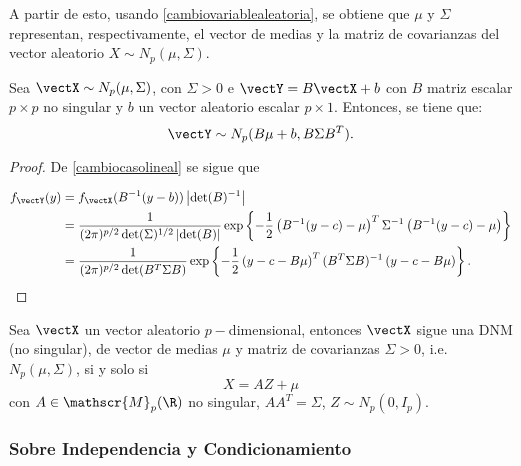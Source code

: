 A partir de esto, usando \ref{cambiovariablealeatoria}, se obtiene que $\mu$ y $\Sigma$ representan, respectivamente, el vector de medias y la matriz de covarianzas del vector aleatorio $X \sim N_p(\mu,\Sigma)$.


\begin{nprop} \label{afinnormal}
  Sea $\vectX \sim N_p(\mu,\Sigma)$, con $\Sigma > 0$ e $\vectY = B\vectX+b$ con $B$ matriz escalar $p\times p$ no singular y $b$ un vector aleatorio escalar $p\times 1$. Entonces, se tiene que:
  \[
     \vectY \sim N_p(B\mu+b, B \Sigma B^T)
  .\]
\end{nprop}

\begin{proof}
  De \ref{cambiocasolineal} se sigue que

  \[
  \begin{split}
    f_{\vectY}(y) & = f_{\vectX}(B^{-1}(y-b))\left|\det(B)^{-1}\right| \\
    & = \frac{1}{(2\pi)^{p/2} \det(\Sigma)^{1/2} \left|\det(B)\right|}
    \exp\left\{ -\frac{1}{2} \left(B^{-1}(y-c) - \mu\right)^T \Sigma^{-1} \left(B^{-1}(y-c) - \mu \right) \right\} \\
    & = \frac{1}{(2\pi)^{p/2} \det(B^T\Sigma B)}
    \exp\left\{ -\frac{1}{2} \left(y-c - B\mu\right)^T (B^T\Sigma B)^{-1} \left(y - c - B\mu \right) \right\}.
  \end{split}
  \]
\end{proof}

\begin{nth}
  Sea $\vectX$ un vector aleatorio $p-$dimensional, entonces $\vectX$ sigue una DNM (no singular), de vector de medias $\mu$ y matriz de covarianzas $\Sigma > 0$, i.e. $N_p(\mu,\Sigma)$, si y solo si
  \[
X = AZ + \mu
\]
con $A\in \mathscr{M}_{p}(\R)$ no singular, $AA^T = \Sigma$, $Z \sim N_p(0,I_p)$.
\end{nth}

\subsubsection{Sobre Independencia y Condicionamiento}

